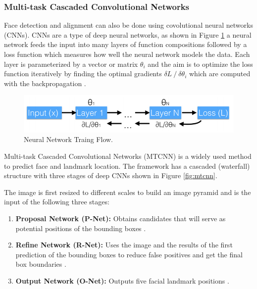 \documentclass[12pt,english]{article}
\begin{document}
\subsubsection{Multi-task Cascaded Convolutional Networks}
\quad
Face detection and alignment can also be done using covolutional neural networks (CNNs). CNNs are a type of deep neural networks, as shown in Figure \ref{fig:nnflow} a neural network feeds the input into many layers of function compositions followed by a loss function which measures how well the neural network models the data. Each layer is parameterized by a vector or matrix $\theta_{i}$ and the aim is to optimize the loss function iteratively by finding the optimal gradients $\delta L \mathbin{/} \delta  \theta_{i}$ which are computed with the backpropagation \cite{amos}. 

\begin{figure}[!tbp]
 \centering
    \includegraphics[width=\columnwidth]{figures/neural_flow.png}
    \caption{Neural Network Traing Flow. \cite{amos}}
	\label{fig:nnflow}
\end{figure}


Multi-task Cascaded Convolutional Networks (MTCNN) is a widely used method to predict face and landmark location. The framework has a cascaded (waterfall) structure with three stages of deep CNNs shown in Figure \ref{fig:mtcnn}. \cite{zhang} 

The image is first resized to different scales to build an image pyramid and is the input of the following three stages:

\begin{enumerate}
\item \textbf{Proposal Network (P-Net):} Obtains candidates that will serve as potential positions of the bounding boxes \cite{chinapas}.

\item \textbf{Refine Network (R-Net):} Uses the image and the results of the first prediction of the bounding boxes to reduce false positives and get the final box boundaries \cite{chinapas}.

\item \textbf{Output Network (O-Net):} Outputs five facial landmark positions \cite{zhang}.

\end{enumerate}
\end{document}
